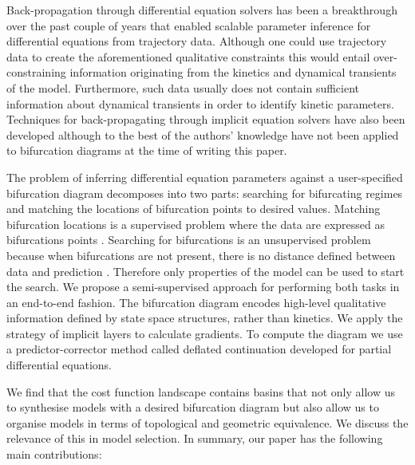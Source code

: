 \documentclass{article}
\begin{document}
Back-propagation through differential equation solvers has been a breakthrough over the past couple of years \cite{Chen2018NeuralEquations,Rackauckas2019DiffEqFlux.jlEquations} that enabled scalable parameter inference for differential equations from trajectory data. Although one could use trajectory data to create the aforementioned qualitative constraints \cite{Ranciati2017BayesianParameters,Khadivar2021LearningBifurcations} this would entail over-constraining information originating from the kinetics and dynamical transients of the model. Furthermore, such data usually does not contain sufficient information about dynamical transients in order to identify kinetic parameters. Techniques for back-propagating through implicit equation solvers have also been developed \cite{Look2020DifferentiableLayers,Bai2019DeepModels} although to the best of the authors' knowledge have not been applied to bifurcation diagrams at the time of writing this paper.

The problem of inferring differential equation parameters against a user-specified bifurcation diagram decomposes into two parts: searching for bifurcating regimes and matching the locations of bifurcation points to desired values. Matching bifurcation locations is a supervised problem where the data are expressed as bifurcations points \cite{Lu2006InverseSystems,Conrad2006BifurcationClock}. Searching for bifurcations is an unsupervised problem because when bifurcations are not present, there is no distance defined between data and prediction \cite{Chickarmane2005BifurcationTool}. Therefore only properties of the model can be used to start the search. We propose a semi-supervised approach for performing both tasks in an end-to-end fashion. The bifurcation diagram encodes high-level qualitative information defined by state space structures, rather than kinetics. We apply the strategy of implicit layers \cite{Look2020DifferentiableLayers,Bai2019DeepModels} to calculate gradients. To compute the diagram we use a predictor-corrector method called deflated continuation \cite{Farrell2016TheDiagrams,Veltz2020BifurcationKit.jl} developed for partial differential equations.

We find that the cost function landscape contains basins that not only allow us to synthesise models with a desired bifurcation diagram but also allow us to organise models in terms of topological and geometric equivalence. We discuss the relevance of this in model selection. In summary, our paper has the following main contributions:
\end{document}
